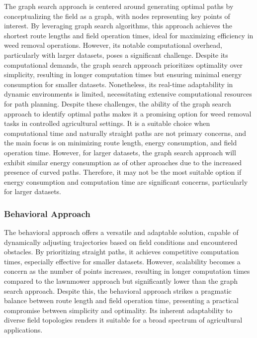 The graph search approach is centered around generating optimal paths by conceptualizing the field as a graph, with nodes representing key points of interest. By leveraging graph search algorithms, this approach achieves the shortest route lengths and field operation times, ideal for maximizing efficiency in weed removal operations. However, its notable computational overhead, particularly with larger datasets, poses a significant challenge. Despite its computational demands, the graph search approach prioritizes optimality over simplicity, resulting in longer computation times but ensuring minimal energy consumption for smaller datasets. Nonetheless, its real-time adaptability in dynamic environments is limited, necessitating extensive computational resources for path planning. Despite these challenges, the ability of the graph search approach to identify optimal paths makes it a promising option for weed removal tasks in controlled agricultural settings. It is a suitable choice when computational time and naturally straight paths are not primary concerns, and the main focus is on minimizing route length, energy consumption, and field operation time. However, for larger datasets, the graph search approach will exhibit similar energy consumption as of other aproaches due to the increased presence of curved paths. Therefore, it may not be the most suitable option if energy consumption and computation time are significant concerns, particularly for larger datasets.   

\subsubsection{Behavioral Approach}

The behavioral approach offers a versatile and adaptable solution, capable of dynamically adjusting trajectories based on field conditions and encountered obstacles. By prioritizing straight paths, it achieves competitive computation times, especially effective for smaller datasets. However, scalability becomes a concern as the number of points increases, resulting in longer computation times compared to the lawnmower approach but significantly lower than the graph search approach. Despite this, the behavioral approach strikes a pragmatic balance between route length and field operation time, presenting a practical compromise between simplicity and optimality. Its inherent adaptability to diverse field topologies renders it suitable for a broad spectrum of agricultural applications.


